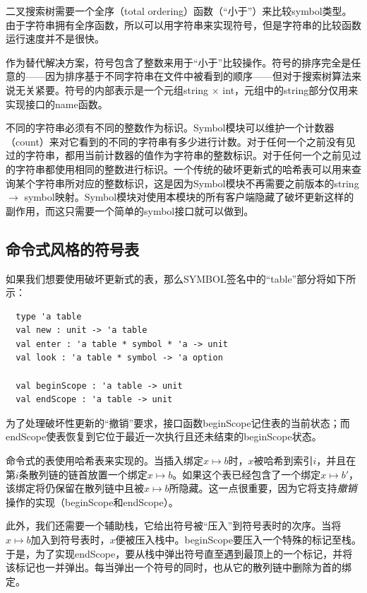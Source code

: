 \documentclass[cn,11pt,chinese]{elegantbook}
\begin{document}
二叉搜索树需要一个全序（total ordering）函数（“小于”）来比较symbol类型。由于字符串拥有全序函数，所以可以用字符串来实现符号，但是字符串的比较函数运行速度并不是很快。

作为替代解决方案，符号包含了整数来用于“小于”比较操作。符号的排序完全是任意的——因为排序基于不同字符串在文件中被看到的顺序——但对于搜索树算法来说无关紧要。符号的内部表示是一个元组string $\times$ int，元组中的string部分仅用来实现接口的name函数。

不同的字符串必须有不同的整数作为标识。Symbol模块可以维护一个计数器（count）来对它看到的不同的字符串有多少进行计数。对于任何一个之前没有见过的字符串，都用当前计数器的值作为字符串的整数标识。对于任何一个之前见过的字符串都使用相同的整数进行标识。一个传统的破坏更新式的哈希表可以用来查询某个字符串所对应的整数标识，这是因为Symbol模块不再需要之前版本的string $\rightarrow$ symbol映射。Symbol模块对使用本模块的所有客户端隐藏了破坏更新这样的副作用，而这只需要一个简单的symbol接口就可以做到。

\subsection{命令式风格的符号表}

如果我们想要使用破坏更新式的表，那么SYMBOL签名中的“table”部分将如下所示：

\begin{lstlisting}
  type 'a table
  val new : unit -> 'a table
  val enter : 'a table * symbol * 'a -> unit
  val look : 'a table * symbol -> 'a option

  val beginScope : 'a table -> unit
  val endScope : 'a table -> unit
\end{lstlisting}

为了处理破坏性更新的“撤销”要求，接口函数beginScope记住表的当前状态；而endScope使表恢复到它位于最近一次执行且还未结束的beginScope状态。

命令式的表使用哈希表来实现的。当插入绑定$x\mapsto b$时，$x$被哈希到索引$i$，并且在第$i$条散列链的链首放置一个绑定$x\mapsto b$。如果这个表已经包含了一个绑定$x\mapsto b'$，该绑定将仍保留在散列链中且被$x\mapsto b$所隐藏。这一点很重要，因为它将支持\textit{撤销}操作的实现（beginScope和endScope）。

此外，我们还需要一个辅助栈，它给出符号被“压入”到符号表时的次序。当将$x\mapsto b$加入到符号表时，$x$便被压入栈中。beginScope要压入一个特殊的标记至栈。于是，为了实现endScope，要从栈中弹出符号直至遇到最顶上的一个标记，并将该标记也一并弹出。每当弹出一个符号的同时，也从它的散列链中删除为首的绑定。
\end{document}
